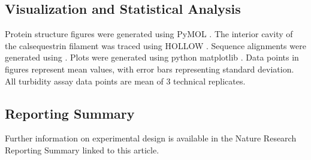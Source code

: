 \subsection*{Visualization and Statistical Analysis}
Protein structure figures were generated using PyMOL \supercite{PyMOL}. The interior cavity of the calsequestrin filament was traced using HOLLOW \supercite{Ho2008-og}. Sequence alignments were generated using \TeXshade \supercite{Beitz2000-lf}. Plots were generated using python matplotlib \supercite{Hunter:2007}. Data points in figures represent mean values, with error bars representing standard deviation. All turbidity assay data points are mean of 3 technical replicates.

\subsection*{Reporting Summary}
Further information on experimental design is available in the Nature Research Reporting Summary linked to this article.